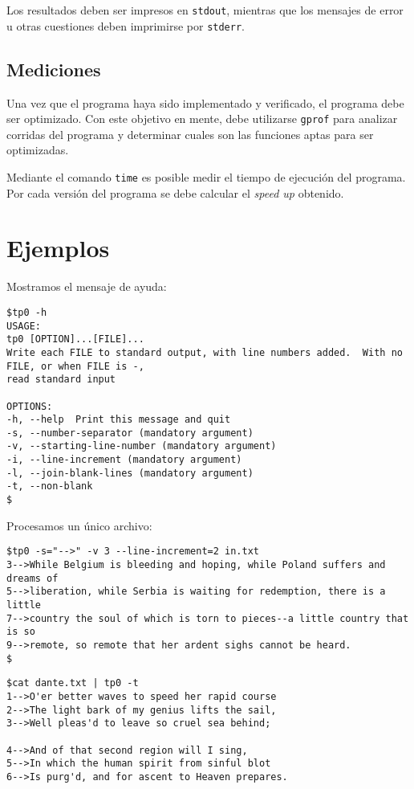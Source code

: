 \documentclass[9pt,a4paper]{article}
\newcommand{\stdout}{\texttt{stdout}}
\newcommand{\stderr}{\texttt{stderr}}
\newcommand{\gprof}{\texttt{gprof}}
\newcommand{\unixtime}{\texttt{time}}
\begin{document}
Los resultados deben ser impresos en \stdout{}, mientras que los mensajes de error u otras cuestiones deben imprimirse por \stderr{}.

\subsection{Mediciones}
Una vez que el programa haya sido implementado y verificado, el programa debe ser optimizado. Con este objetivo en mente, debe
utilizarse \gprof{} para analizar corridas del programa y determinar cuales son las funciones aptas para ser optimizadas.

Mediante el comando \unixtime\cite{TIME} es posible medir el tiempo de ejecución del programa. Por cada versión del programa
se debe calcular el \textit{speed up} obtenido.

\section{Ejemplos}

\noindent
Mostramos el mensaje de ayuda:
\begin{small}
\begin{verbatim}
$tp0 -h
USAGE:
tp0 [OPTION]...[FILE]...
Write each FILE to standard output, with line numbers added.  With no FILE, or when FILE is -,
read standard input

OPTIONS:
-h, --help	Print this message and quit
-s, --number-separator (mandatory argument)
-v, --starting-line-number (mandatory argument)
-i, --line-increment (mandatory argument)
-l, --join-blank-lines (mandatory argument)
-t, --non-blank
$
\end{verbatim}
\end{small}

\noindent
Procesamos un único archivo:
\begin{small}
\begin{verbatim}
$tp0 -s="-->" -v 3 --line-increment=2 in.txt
3-->While Belgium is bleeding and hoping, while Poland suffers and dreams of
5-->liberation, while Serbia is waiting for redemption, there is a little
7-->country the soul of which is torn to pieces--a little country that is so
9-->remote, so remote that her ardent sighs cannot be heard.
$
\end{verbatim}
\end{small}

\begin{small}
\begin{verbatim}
$cat dante.txt | tp0 -t
1-->O'er better waves to speed her rapid course
2-->The light bark of my genius lifts the sail,
3-->Well pleas'd to leave so cruel sea behind;

4-->And of that second region will I sing,
5-->In which the human spirit from sinful blot
6-->Is purg'd, and for ascent to Heaven prepares.
\end{verbatim}
\end{small}
\end{document}
